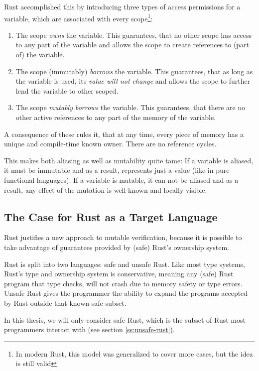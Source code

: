 \documentclass{book}
\theoremstyle{definition}
\begin{document}
Rust accomplished this by introducing three types of access permissions for a variable, which are associated with every scope\footnote{In modern Rust, this model was generalized to cover more cases, but the idea is still valid}:
\begin{enumerate}
  \item The scope \textit{owns} the variable. This guarantees, that no other scope has access to any part of the variable and allows the scope to create references to (part of) the variable.
  \item The scope (immutably) \textit{borrows} the variable. This guarantees, that as long as the variable is used, its \textit{value will not change} and allows the scope to further lend the variable to other scoped.
  \item The scope \textit{mutably borrows} the variable. This guarantees, that there are no other active references to any part of the memory of the variable.
\end{enumerate}

A consequence of these rules it, that at any time, every piece of memory has a unique and compile-time known owner. There are no reference cycles.

This makes both aliasing as well as mutability quite tame:
If a variable is aliased, it must be immutable and as a result, represents just a value (like in pure functional languages).
If a variable is mutable, it can not be aliased and as a result, any effect of the mutation is well known and locally visible.

\subsection{The Case for Rust as a Target Language}


Rust justifies a new approach to mutable verification, because it is possible to take advantage of guarantees provided by (safe) Rust's ownership system. 

Rust is split into two languages: safe and unsafe Rust. Like most type systems, Rust's type and ownership system is conservative, meaning any (safe) Rust program that type checks, will not crash due to memory safety or type errors. Unsafe Rust gives the programmer the ability to expand the programs accepted by Rust outside that known-safe subset.

In this thesis, we will only consider safe Rust, which is the subset of Rust most programmers interact with (see section \ref{ss:unsafe-rust}).
\end{document}
